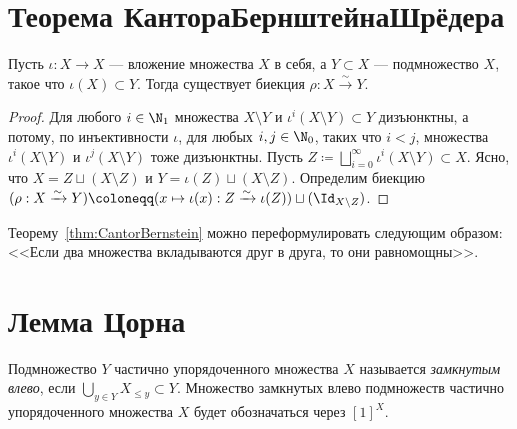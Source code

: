 \documentclass[
	extrafontsizes,
	11pt,
	hyphens,
]{memoir}
\begin{document}
\section{Теорема Кантора\namedash{}Бернштейна\namedash{}Шрёдера}

\begin{theorem}
Пусть \(\iota : X \to X\) --- вложение множества \(X\) в себя, а \(Y \subset X\) --- подмножество \(X\), такое что \(\iota(X) \subset Y\).
\label{thm:CantorBernstein}
Тогда существует биекция \(\rho : X \xrightarrow{\sim} Y\).
\end{theorem}

\begin{proof}
Для любого \(i \in \N_1\) множества \(X \setminus Y\) и \(\iota^i(X \setminus Y) \subset Y\) дизъюнктны, а потому, по инъективности \(\iota\), для любых \(i,j \in \N_0\), таких что \(i < j\), множества \(\iota^i(X \setminus Y)\) и \(\iota^j(X \setminus Y)\) тоже дизъюнктны.
Пусть \(Z \coloneqq \bigsqcup_{i = 0}^{\infty} \iota^i(X \setminus Y) \subset X\).
Ясно, что \(X = Z \sqcup (X \setminus Z)\) и \(Y = \iota(Z) \sqcup (X \setminus Z)\).
Определим биекцию \((\rho : X \xrightarrow{\sim} Y) \coloneqq (x \mapsto \iota(x) : Z \xrightarrow{\sim} \iota(Z)) \sqcup (\Id_{X \setminus Z})\).
\end{proof}

\begin{remark}
Теорему~\ref{thm:CantorBernstein} можно переформулировать следующим образом: <<Если два множества вкладываются друг в друга, то они равномощны>>.
\end{remark}


\section{Лемма Цорна}


\begin{definition}
Подмножество \(Y\) частично упорядоченного множества \(X\) называется \emph{замкнутым влево}, если \(\bigcup_{y \in Y} X_{\leq y} \subset Y\).
Множество замкнутых влево подмножеств частично упорядоченного множества \(X\) будет обозначаться через \([1]^X\).
\end{definition}
\end{document}
